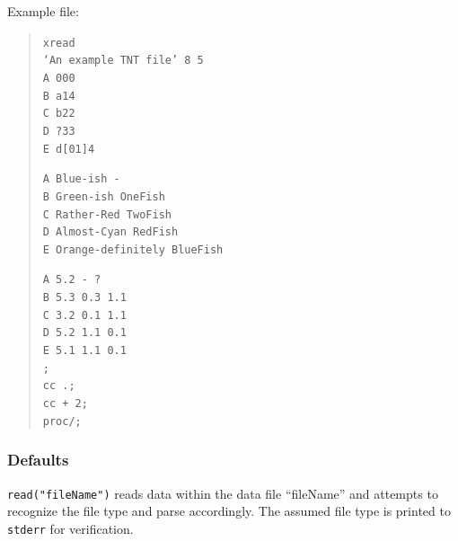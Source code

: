 \begin{description}
		  Example file:
		  	\begin{quote}
			  	\texttt{xread\\
				  	`An example TNT file' 8 5\\
				  	A 000\\
				  	B a14\\
				  	C b22\\
				  	D ?33\\
				  	E d[01]4\\}
			  	
			  	\texttt{A Blue-ish -\\
				  	B Green-ish OneFish\\
				  	C Rather-Red TwoFish\\
				  	D Almost-Cyan RedFish\\
				  	E Orange-definitely BlueFish\\}
					
				\texttt{A 5.2 - ?\\
					 B 5.3 0.3 1.1\\
					 C 3.2 0.1 1.1\\
					 D 5.2 1.1 0.1\\
					 E 5.1 1.1 0.1\\
				  	;\\
				  	cc .;\\
				  	cc + 2;\\
				  	proc/;\\}
			  \end{quote}
	\end{description}	
		
	\subsubsection{Defaults}
		\texttt{read("fileName")} reads data within the data file ``fileName'' and attempts to 
		recognize the file type and parse accordingly. The assumed file type is printed to 
		\texttt{stderr} for verification.
		
